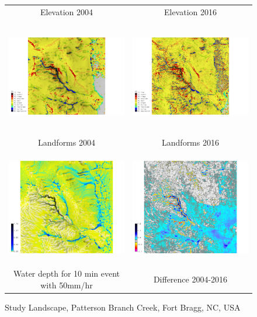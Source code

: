 \begin{figure}[h]
\begin{tabular}{m{} m{}}
\multicolumn{1}{c}{Elevation 2004} & \multicolumn{1}{c}{Elevation 2016}\\
%
\multicolumn{1}{c}{\includegraphics[height=50mm]{../images/sample_data/landforms_2004.png}} &
\multicolumn{1}{c}{\includegraphics[height=50mm]{../images/sample_data/landforms_2016.png}}\\
\multicolumn{1}{c}{Landforms 2004} & \multicolumn{1}{c}{Landforms 2016}\\
%
\multicolumn{1}{c}{\includegraphics[height=50mm]{../images/sample_data/depth_2016.png}} &
\multicolumn{1}{c}{\includegraphics[height=50mm]{../images/sample_data/difference_2004_2016.png}}\\
\multicolumn{1}{c}{Water depth for 10 min event with 50mm/hr} & \multicolumn{1}{c}{Difference 2004-2016}\\
%
\end{tabular}
\caption{Study Landscape, Patterson Branch Creek, Fort Bragg, NC, USA}
\label{fig:study_area}
%
\end{figure}